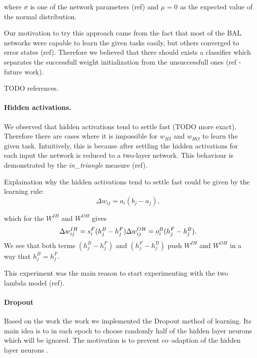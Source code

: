 where $\sigma$ is one of the network parameters (ref) and $\mu = 0$ as the expected value of the normal distribution. 

Our motivation to try this approach came from the fact that most of the BAL networks were capable to learn the given tasks easily, but others converged to error states (ref). Therefore we believed that there should exists a classifier which separates the successfull weight initialization from the unsuccessfull ones (ref - future work). 

TODO references.  

\paragraph{Hidden activations.}
\label{sec:our-hidden-activation} 

We observed that hidden activations tend to settle fast (TODO more exact). Therefore there are cases where it is impossible for $w_{HI}$ and $w_{HO}$ to learn the given task. Intuitively, this is because after settling the hidden activations for each input the network is reduced to a two-layer network. This behaviour is demonstrated by the \emph{in\_triangle} measure (ref). 

Explaination why the hidden activations tend to settle fast could be given by the learning rule: 
\begin{equation} 
\Delta w_{ij} = a_i(b_j - a_j),
\end{equation} 

which for the $W^{IH}$ and $W^{OH}$ gives
\begin{equation} 
\Delta w_{ij}^{IH} = s^F_i(h^B_j - h^F_j) \\ 
\Delta w_{ij}^{OH} = o^B_i(h^F_j - h^B_j). 
\end{equation} 
We see that both terms $(h^B_j - h^F_j)$ and $(h^F_j - h^B_j)$ push $W^{IH}$ and $W^{OH}$ in a way that $h^B_j = h^F_j$. 

This experiment was the main reason to start experimenting with the two lambda model (ref). 

\paragraph{Dropout}
Based on the work the work \citet{hinton2012improving} we implemented the Dropout method of learning. Its main idea is to in each epoch to choose randomly half of the hidden layer neurons which will be ignored. The motivation is to prevent co--adaption of the hidden layer neurons \citep{hinton2012improving}. 

